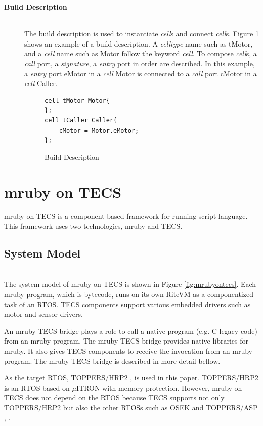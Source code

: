 \documentclass[a4j,12pt,oneside,openany,english]{jsbook}
\begin{document}
\begin{description}
    \item[{\bf Build Description}]\mbox{}\\
        The build description is used to instantiate {\it cell}s and connect {\it cell}s.
        Figure \ref{build} shows an example of a build description.
        A {\it celltype} name such as tMotor, and a {\it cell} name such as Motor follow the keyword {\it cell}.
        To compose {\it cell}s, a {\it call} port, a {\it signature}, a {\it entry} port in order are described.
        In this example, a {\it entry} port eMotor in a {\it cell} Motor is connected to a {\it call} port cMotor in a {\it cell} Caller.\\
\begin{figure}[t]
\centering
\begin{lstlisting}
cell tMotor Motor{
};
cell tCaller Caller{
    cMotor = Motor.eMotor;
};
\end{lstlisting}
\caption{Build Description}
\label{build}
\end{figure}

\end{description}

\section{mruby on TECS}
\label{sec:mruby on TECS}
mruby on TECS is a component-based framework for running script language.
This framework uses two technologies, mruby and TECS.

\subsection{System Model}\mbox{}\\

The system model of mruby on TECS is shown in Figure \ref{fig:mrubyontecs}.
Each mruby program, which is bytecode, runs on its own RiteVM as a componentized task of an RTOS.
TECS components support various embedded drivers such as motor and sensor drivers.

An mruby-TECS bridge plays a role to call a native program (e.g. C legacy code) from an mruby program.
The mruby-TECS bridge provides native libraries for mruby.
It also gives TECS components to receive the invocation from an mruby program.
The mruby-TECS bridge is described in more detail bellow.

As the target RTOS, TOPPERS/HRP2 \cite{url:HRP2}, \cite{par:hr-tecs} is used in this paper.
TOPPERS/HRP2 is an RTOS based on $\mu$ITRON \cite{par:microITRON} with memory protection.
However, mruby on TECS does not depend on the RTOS because TECS supports not only TOPPERS/HRP2 but also the other RTOSs such as OSEK \cite{par:OSEK} and TOPPERS/ASP \cite{par:ASP}, \cite{url:ASP}.
\end{document}
